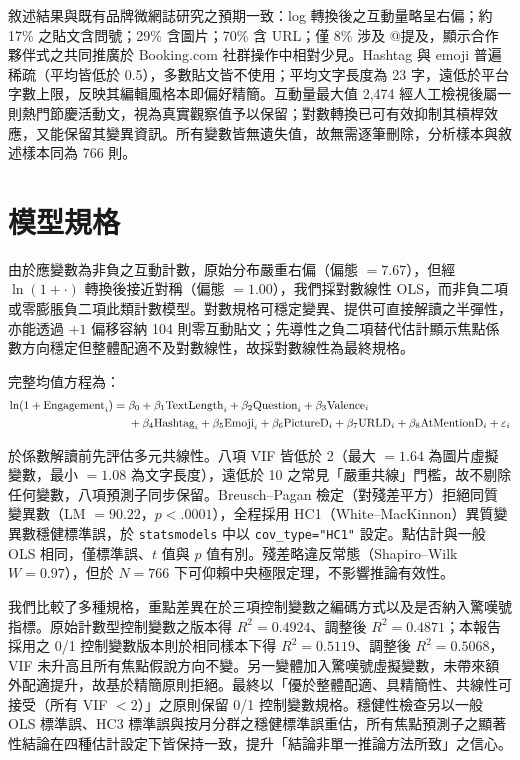 \documentclass[12pt,a4paper]{ctexart}
\begin{document}
敘述結果與既有品牌微網誌研究之預期一致：log 轉換後之互動量略呈右偏；約 17\% 之貼文含問號；29\% 含圖片；70\% 含 URL；僅 8\% 涉及 @提及，顯示合作夥伴式之共同推廣於 Booking.com 社群操作中相對少見。Hashtag 與 emoji 普遍稀疏（平均皆低於 0.5），多數貼文皆不使用；平均文字長度為 23 字，遠低於平台字數上限，反映其編輯風格本即偏好精簡。互動量最大值 2{,}474 經人工檢視後屬一則熱門節慶活動文，視為真實觀察值予以保留；對數轉換已可有效抑制其槓桿效應，又能保留其變異資訊。所有變數皆無遺失值，故無需逐筆刪除，分析樣本與敘述樣本同為 766 則。

\section{模型規格}

由於應變數為非負之互動計數，原始分布嚴重右偏（偏態 $=7.67$），但經 $\ln(1+\cdot)$ 轉換後接近對稱（偏態 $=1.00$），我們採對數線性 OLS，而非負二項或零膨脹負二項此類計數模型。對數規格可穩定變異、提供可直接解讀之半彈性，亦能透過 $+1$ 偏移容納 104 則零互動貼文；先導性之負二項替代估計顯示焦點係數方向穩定但整體配適不及對數線性，故採對數線性為最終規格。

完整均值方程為：
\begin{equation}\small
\begin{aligned}
\ln(1+\text{Engagement}_i) ={}& \beta_0 + \beta_1\text{TextLength}_i + \beta_2\text{Question}_i + \beta_3\text{Valence}_i \\
& + \beta_4\text{Hashtag}_i + \beta_5\text{Emoji}_i + \beta_6\text{PictureD}_i + \beta_7\text{URLD}_i + \beta_8\text{AtMentionD}_i + \varepsilon_i
\end{aligned}
\end{equation}

於係數解讀前先評估多元共線性。八項 VIF 皆低於 2（最大 $=1.64$ 為圖片虛擬變數，最小 $=1.08$ 為文字長度），遠低於 10 之常見「嚴重共線」門檻，故不剔除任何變數，八項預測子同步保留。Breusch--Pagan 檢定（對殘差平方）拒絕同質變異數（LM $=90.22$，$p<.0001$），全程採用 HC1（White--MacKinnon）異質變異數穩健標準誤，於 \texttt{statsmodels} 中以 \texttt{cov\_type="HC1"} 設定。點估計與一般 OLS 相同，僅標準誤、$t$ 值與 $p$ 值有別。殘差略違反常態（Shapiro--Wilk $W=0.97$），但於 $N=766$ 下可仰賴中央極限定理，不影響推論有效性。

我們比較了多種規格，重點差異在於三項控制變數之編碼方式以及是否納入驚嘆號指標。原始計數型控制變數之版本得 $R^2=0.4924$、調整後 $R^2=0.4871$；本報告採用之 0/1 控制變數版本則於相同樣本下得 $R^2=0.5119$、調整後 $R^2=0.5068$，VIF 未升高且所有焦點假說方向不變。另一變體加入驚嘆號虛擬變數，未帶來額外配適提升，故基於精簡原則拒絕。最終以「優於整體配適、具精簡性、共線性可接受（所有 VIF $<2$）」之原則保留 0/1 控制變數規格。穩健性檢查另以一般 OLS 標準誤、HC3 標準誤與按月分群之穩健標準誤重估，所有焦點預測子之顯著性結論在四種估計設定下皆保持一致，提升「結論非單一推論方法所致」之信心。
\end{document}
